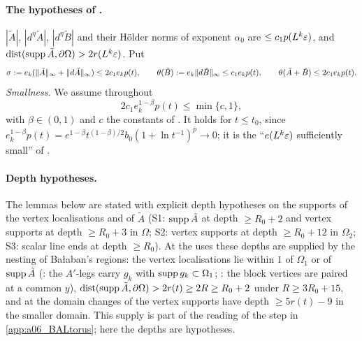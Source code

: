 \paragraph{The hypotheses of \cite[p.~412]{Ba3}.} $|\tilde A|$, $|d^\eta\tilde A|$, $|d^\eta\tilde B|$ and their H\"older norms of exponent $\alpha_0$ are $\le c_1p(L^k\varepsilon)$, and $\operatorname{dist}(\operatorname{supp}\tilde A,\partial\Omega)>2r(L^k\varepsilon)$. Put
\[
\sigma:= e_k(\lVert \tilde A\rVert_\infty+\lVert d\tilde A\rVert_\infty)\le2c_1e_kp(t),\qquad \theta(\tilde B):= e_k\lVert d\tilde B\rVert_\infty\le c_1e_kp(t),\qquad\theta(\tilde A+\tilde B)\le2c_1e_kp(t).
\]
\emph{Smallness.} We assume throughout
\begin{equation}\label{sup1:eq:E}
2c_1e_k^{1-\beta}p(t)\le\min\{c,1\},\tag{E}
\end{equation}
with $\beta\in(0,1)$ and $c$ the constants of \cite[(2.23)]{Ba1}. It holds for $t\le t_0$, since $e_k^{1-\beta}p(t)=e^{1-\beta}t^{(1-\beta)/2}b_0(1+\ln t^{-1})^{\bar p}\to0$; it is the ``$e(L^k\varepsilon)$ sufficiently small'' of \cite[Prop.~2.1]{Ba1}.

\paragraph{Depth hypotheses.} The lemmas below are stated with explicit depth hypotheses on the supports of the vertex localisations and of $\tilde A$ (S1: $\operatorname{supp}\tilde A$ at depth $\ge R_0+2$ and vertex supports at depth $\ge R_0+3$ in $\Omega$; S2: vertex supports at depth $\ge R_0+12$ in $\Omega_2$; S3: scalar line ends at depth $\ge R_0$). At the uses these depths are supplied by the nesting of Ba{\l}aban's regions: the vertex localisations lie within $1$ of $\Omega_1$ or of $\operatorname{supp}\tilde A$ (\cite[p.~412]{Ba3}: the $A'$-legs carry $g_k$ with $\operatorname{supp} g_k\subset\Omega_1$; \cite[p.~414]{Ba3}: the block vertices \cite[(1.13)--(1.15)]{Ba3} are paired at a common $y$), $\operatorname{dist}(\operatorname{supp}\tilde A,\partial\Omega)>2r(t)\ge2R\ge R_0+2$ under $R\ge3R_0+15$, and at the domain changes of \cite[pp.~579--580]{Ba2} the vertex supports have depth $\ge5r(t)-9$ in the smaller domain. This supply is part of the reading of the step in \cref{app:a06_BALtorus}; here the depths are hypotheses.


